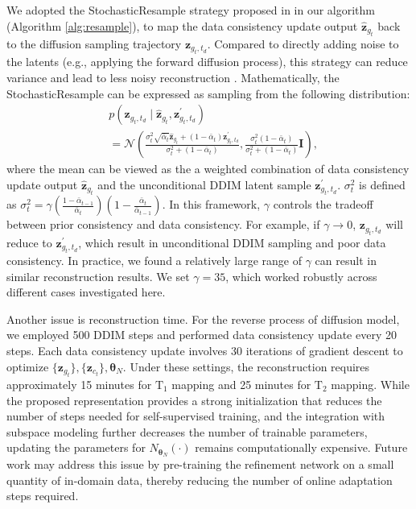 \documentclass[journal,twoside,web]{ieeecolor}
\begin{document}
We adopted the StochasticResample strategy proposed in \cite{song2023solving} in our algorithm (Algorithm \ref{alg:resample}), to map the data consistency update output $\hat{\mathbf{z}}_{g_t}$ back to the diffusion sampling trajectory ${\mathbf{z}}_{g_t,t_d}$. Compared to directly adding noise to the latents (e.g., applying the forward diffusion process), this strategy  can reduce variance and lead to less noisy reconstruction \cite{song2023solving}. Mathematically, the StochasticResample can be expressed as sampling from the following distribution:
\begin{equation}
\begin{split}
&
p({\mathbf{z}}_{g_t,t_d} \mid \hat{\mathbf{z}}_{g_t},\mathbf{z}_{g_t,t_d}^{\prime})
\\& =\mathcal{N}\left(\frac{\sigma_t^2 \sqrt{\bar{\alpha}_t} \hat{\mathbf{z}}_{g_t}+\left(1-\bar{\alpha}_t\right) \mathbf{z}_{g_t,t_d}^{\prime}}{\sigma_t^2+\left(1-\bar{\alpha}_t\right)}, \frac{\sigma_t^2\left(1-\bar{\alpha}_t\right)}{\sigma_t^2+\left(1-\bar{\alpha}_t\right)} \boldsymbol{I}\right),
\label{recon_alg_resample}
\end{split}
\end{equation}
where the mean can be viewed as the a weighted combination of data consistency update output $\hat{\mathbf{z}}_{g_t}$ and the unconditional DDIM latent sample $\mathbf{z}_{g_t,t_d}^{\prime}$. $\sigma_t^2$ is defined as $\sigma_t^2=\gamma\left(\frac{1-\bar{\alpha}_{t-1}}{\bar{\alpha}_t}\right)\left(1-\frac{\bar{\alpha}_t}{\bar{\alpha}_{t-1}}\right)$. In this framework, $\gamma$ controls the tradeoff between prior consistency and data consistency.
For example, if $\gamma \rightarrow 0$, ${\mathbf{z}}_{g_t,t_d}$ will reduce to $\mathbf{z}_{g_t,t_d}^{\prime}$, which result in unconditional DDIM sampling and poor data consistency. In practice, we found a relatively large range of $
\gamma$ can result in similar reconstruction results. We set $\gamma = 35$, which worked robustly across different cases investigated here.

Another issue is reconstruction time. For the reverse process of diffusion model, we employed 500 DDIM steps and performed data consistency update every 20 steps. Each data consistency update involves 30 iterations of gradient descent to optimize $\{\mathbf{z}_{g_t}\}, \{\mathbf{z}_{c_t}\}, \boldsymbol{\theta}_N$. Under these settings, the reconstruction requires approximately 15 minutes for $\text{T}_1$ mapping and 25 minutes for $\text{T}_2$ mapping. While the proposed representation provides a strong initialization that reduces the number of steps needed for self-supervised training, and the integration with subspace modeling further decreases the number of trainable parameters, updating the parameters for $N_{\boldsymbol{\theta}_N}(\cdot)$ remains computationally expensive. Future work may address this issue by pre-training the refinement network on a small quantity of in-domain data, thereby reducing the number of online adaptation steps required.
\end{document}
